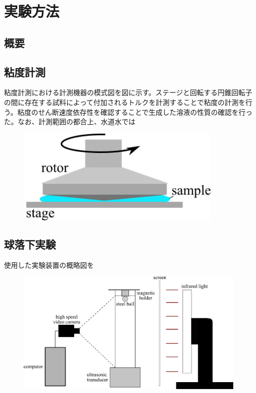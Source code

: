 \chapter{実験方法}
\section{概要}
\section{粘度計測}
粘度計測における計測機器の模式図を図に示す。ステージと回転する円錐回転子の間に存在する試料によって付加されるトルクを計測することで粘度の計測を行う。粘度のせん断速度依存性を確認することで生成した溶液の性質の確認を行った。なお、計測範囲の都合上、水道水では

\begin{figure}[htp]
    \includegraphics[clip,width=10.0cm]{2-Methods/Viscosity-Measurement.png}
\end{figure}

\section{球落下実験}

使用した実験装置の概略図を

\begin{figure}[htp]
    \includegraphics[clip,width=15.0cm]{2-Methods/device.png}
\end{figure}